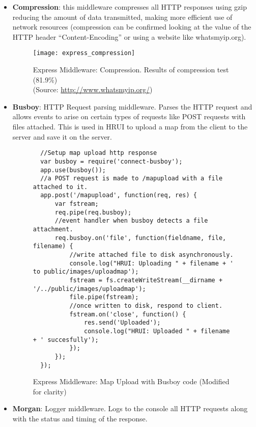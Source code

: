 \begin{itemize}
  \item \textbf{Compression}: this middleware compresses all HTTP responses using gzip reducing the amount of data transmitted, making more efficient use of network resources (compression can be confirmed looking at the value of the HTTP header ``Content-Encoding'' or using a website like whatsmyip.org).
  \begin{figure}[H]
  \captionsetup{justification=centering}
  \begin{center}
    \texttt{[image: express\_compression]}
  \end{center}
  \caption{Express Middleware: Compression. Results of compression test (81.9\%)\\(Source: \url{http://www.whatsmyip.org/})}
  \end{figure}
  \item \textbf{Busboy}: HTTP Request parsing middleware. Parses the HTTP request and allows events to arise on certain types of requests like POST requests with files attached. This is used in HRUI to upload a map from the client to the server and save it on the server.
  \begin{figure}[H]
  \centering
  \captionsetup{justification=centering}
  \begin{verbatim}
  //Setup map upload http response
  var busboy = require('connect-busboy');
  app.use(busboy());
  //a POST request is made to /mapupload with a file attached to it.
  app.post('/mapupload', function(req, res) {
      var fstream;
      req.pipe(req.busboy);
      //event handler when busboy detects a file attachment.
      req.busboy.on('file', function(fieldname, file, filename) {
          //write attached file to disk asynchronously.
          console.log("HRUI: Uploading " + filename + ' to public/images/uploadmap');
          fstream = fs.createWriteStream(__dirname + '/../public/images/uploadmap');
          file.pipe(fstream);
          //once written to disk, respond to client.
          fstream.on('close', function() {
              res.send('Uploaded');
              console.log("HRUI: Uploaded " + filename + ' succesfully');
          });
      });
  });
  \end{verbatim}
  \caption{Express Middleware: Map Upload with Busboy code (Modified for clarity)}
  \end{figure}
  \item \textbf{Morgan}: Logger middleware. Logs to the console all HTTP requests along with the status and timing of the response.

\end{itemize}
